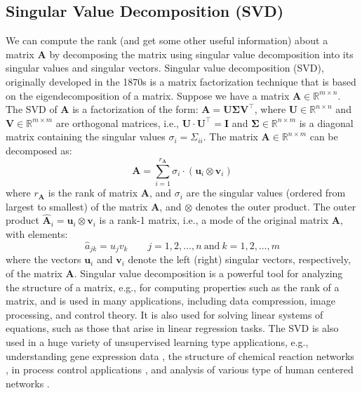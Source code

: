 \documentclass{article}[11pt]
\def\R{\mathbb{R}}
\begin{document}
\subsection{Singular Value Decomposition (SVD)}
We can compute the rank (and get some other useful information) about a matrix $\mathbf{A}$ by decomposing the matrix using singular value decomposition into its singular values and singular vectors.
Singular value decomposition (SVD), originally developed in the 1870s \citep{Stewart:1993} is a matrix factorization technique that is based on the eigendecomposition of a matrix.
Suppose we have a matrix $\mathbf{A} \in \R^{m \times n}$. The SVD of $\mathbf{A}$ is a factorization of the form: $\mathbf{A} = \mathbf{U}\mathbf{\Sigma}\mathbf{V}^{\top}$, where
$\mathbf{U}\in\mathbb{R}^{n\times{n}}$ and $\mathbf{V}\in\mathbb{R}^{m\times{m}}$ are orthogonal matrices, i.e., $\mathbf{U}\cdot\mathbf{U}^{\top} = \mathbf{I}$ and $\mathbf{\Sigma}\in\mathbb{R}^{n\times{m}}$ is a diagonal matrix containing 
the singular values $\sigma_{i}=\Sigma_{ii}$. The matrix $\mathbf{A}\in\mathbb{R}^{n\times{m}}$ can be decomposed as:
\begin{equation}
\mathbf{A} = \sum_{i=1}^{r_{\mathbf{A}}}\sigma_{i}\cdot\left(\mathbf{u}_{i}\otimes\mathbf{v}_{i}\right)
\end{equation}
where $r_{\mathbf{A}}$ is the rank of matrix $\mathbf{A}$, and $\sigma_{i}$ are the singular values (ordered from largest to smallest) of the matrix $\mathbf{A}$,
and $\otimes$ denotes the outer product. 
The outer product $\hat{\mathbf{A}}_{i} = \mathbf{u}_{i}\otimes\mathbf{v}_{i}$ is a rank-1 matrix, i.e., a mode of the original matrix $\mathbf{A}$,  with elements: 
\begin{equation}
\hat{a}_{jk} = u_{j}v_{k}\qquad{j=1,2,\dots,n~\text{and}~k=1,2,\dots,m}
\end{equation}
where the vectors $\mathbf{u}_{i}$ and $\mathbf{v}_{i}$ denote the left (right) singular vectors, respectively, of the matrix $\mathbf{A}$.
Singular value decomposition is a powerful tool for analyzing the structure of a matrix, e.g., for computing properties such as the rank of a matrix, and is used in many applications, 
including data compression, image processing, and control theory. It is also used for solving linear systems of equations,
such as those that arise in linear regression tasks. The SVD is also used in a huge variety of unsupervised learning type applications, e.g., understanding gene expression data \citep{Alter:2000aa, Alter:2006},  
the structure of chemical reaction networks \citep{Famili:2003aa}, 
in process control applications \citep{MooreSVD1986}, and analysis of various type of human centered networks \citep{SASTRY20075275, 7993780}.



\end{document}

